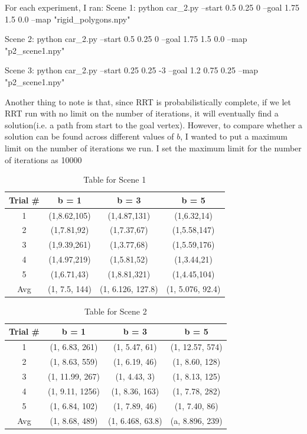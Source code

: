\documentclass{article}
\begin{document}
For each experiment, I ran: \newline 
Scene 1: python car\_2.py --start 0.5 0.25 0 --goal 1.75 1.5 0.0 --map "rigid\_polygons.npy" \newline 

Scene 2: python car\_2.py --start 0.5 0.25 0 --goal 1.75 1.5 0.0 --map "p2\_scene1.npy" \newline

Scene 3: python car\_2.py --start 0.25 0.25 -3 --goal 1.2 0.75 0.25 --map "p2\_scene1.npy" \newline


Another thing to note is that, since RRT is probabilistically complete, if we let RRT run with no limit on the number of iterations, it will eventually find a solution(i.e. a path from start to the goal vertex). However, to compare whether a solution can be found across different values of $b$, I wanted to put a maximum limit on the number of iterations we run. I set the maximum limit for the number of iterations as 10000 
 \newpage 
 
\begin{table}[h!]
  \centering
\begin{tabular}{|c|c|c|c|}
  \hline
  Trial \# & b = 1 & b = 3 & b = 5 \\
  \hline
  1 & (1,8.62,105) & (1,4.87,131) & (1,6.32,14) \\
  2 & (1,7.81,92) & (1,7.37,67) & (1,5.58,147) \\
  3 & (1,9.39,261) & (1,3.77,68) & (1,5.59,176) \\
  4 & (1,4.97,219) & (1,5.81,52) & (1,3.44,21) \\
  5 & (1,6.71,43) & (1,8.81,321) & (1,4.45,104) \\
  Avg & (1, 7.5, 144) & (1, 6.126, 127.8) & (1, 5.076, 92.4)\\
  \hline
\end{tabular} 
\caption{Table for Scene 1}
  \label{tab:mytable}
\end{table}

\begin{table}[h!]
  \centering
\begin{tabular}{|c|c|c|c|}
  \hline
  Trial \# & b = 1 & b = 3 & b = 5 \\
  \hline
  1 & (1, 6.83, 261) & (1, 5.47, 61) & (1, 12.57, 574) \\
  2 & (1, 8.63, 559) & (1, 6.19, 46) & (1, 8.60, 128) \\
  3 & (1, 11.99, 267) & (1, 4.43, 3) & (1, 8.13, 125) \\
  4 & (1, 9.11, 1256) & (1, 8.36, 163) & (1, 7.78, 282) \\
  5 & (1, 6.84, 102) & (1, 7.89, 46) & (1, 7.40, 86) \\
  Avg & (1, 8.68, 489) & (1, 6.468, 63.8) & (a, 8.896, 239) \\
  \hline
\end{tabular} 
\caption{Table for Scene 2}
  \label{tab:mytable}
\end{table}
\end{document}
